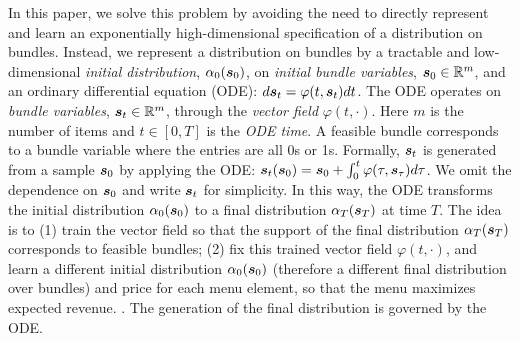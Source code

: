 In this paper, we solve this problem by avoiding the need to directly represent and learn an exponentially high-dimensional specification of a distribution on bundles. Instead, we represent a distribution on bundles by a tractable and low-dimensional \emph{initial distribution}, $\alpha_0({\bm{s}}_0)$, on {\em initial bundle variables}, ${\bm{s}}_0\in \mathbb{R}^m$,
and an ordinary differential equation (ODE): $d{\bm{s}}_t = \varphi(t, {\bm{s}}_t) dt$. The ODE operates on \emph{bundle variables}, ${\bm{s}}_t\in\mathbb{R}^m$, through the {\em vector field} $\varphi(t, \cdot)$. Here $m$ is the number of items and $t\in[0,T]$ is the {\em ODE time}. A feasible bundle corresponds to a bundle variable where the entries are all 0s or 1s. Formally, ${\bm{s}}_t$ is generated from a sample ${\bm{s}}_0$ by applying the ODE: ${\bm{s}}_t({\bm{s}}_0)={\bm{s}}_0+\int_0^t \varphi(\tau,{\bm{s}}_\tau) d\tau$. We omit the dependence on ${\bm{s}}_0$ and write ${\bm{s}}_t$ for simplicity.
In this way, the ODE transforms the initial distribution $\alpha_0({\bm{s}}_0)$ to a final distribution $\alpha_T({\bm{s}}_T)$ at time $T$. The idea is to (1) train the vector field so that the support of the final distribution $\alpha_T({\bm{s}}_T)$ corresponds to feasible bundles; (2) fix this trained vector field $\varphi(t, \cdot)$, and learn a different initial distribution $\alpha_0({\bm{s}}_0)$ (therefore a different final distribution over bundles) and price for each menu
element, so that the menu maximizes expected revenue. 
.
The generation of the final distribution is governed by the ODE. 
\fi


